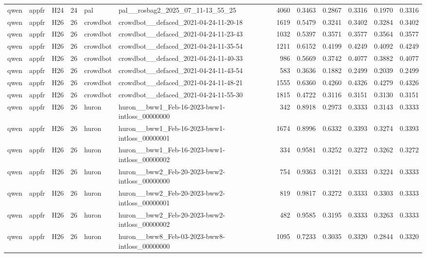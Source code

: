 \begin{table}[tbp]
\begin{tabular}{lllrllrrrrrr}
qwen & appfr & H24 & 24 & pal & pal\_\_rosbag2\_2025\_07\_11-13\_55\_25 & 4060 & 0.3463 & 0.2867 & 0.3316 & 0.1970 & 0.3316 \\
qwen & appfr & H26 & 26 & crowdbot & crowdbot\_\_defaced\_2021-04-24-11-20-18 & 1619 & 0.5479 & 0.3241 & 0.3402 & 0.3284 & 0.3402 \\
qwen & appfr & H26 & 26 & crowdbot & crowdbot\_\_defaced\_2021-04-24-11-23-43 & 1032 & 0.5397 & 0.3571 & 0.3577 & 0.3564 & 0.3577 \\
qwen & appfr & H26 & 26 & crowdbot & crowdbot\_\_defaced\_2021-04-24-11-35-54 & 1211 & 0.6152 & 0.4199 & 0.4249 & 0.4092 & 0.4249 \\
qwen & appfr & H26 & 26 & crowdbot & crowdbot\_\_defaced\_2021-04-24-11-40-33 & 986 & 0.5669 & 0.3742 & 0.4077 & 0.3882 & 0.4077 \\
qwen & appfr & H26 & 26 & crowdbot & crowdbot\_\_defaced\_2021-04-24-11-43-54 & 583 & 0.3636 & 0.1882 & 0.2499 & 0.2039 & 0.2499 \\
qwen & appfr & H26 & 26 & crowdbot & crowdbot\_\_defaced\_2021-04-24-11-48-21 & 1555 & 0.6360 & 0.4260 & 0.4326 & 0.4279 & 0.4326 \\
qwen & appfr & H26 & 26 & crowdbot & crowdbot\_\_defaced\_2021-04-24-11-55-30 & 1815 & 0.4722 & 0.3116 & 0.3151 & 0.3130 & 0.3151 \\
qwen & appfr & H26 & 26 & huron & huron\_\_bww1\_Feb-16-2023-bww1-intloss\_00000000 & 342 & 0.8918 & 0.2973 & 0.3333 & 0.3143 & 0.3333 \\
qwen & appfr & H26 & 26 & huron & huron\_\_bww1\_Feb-16-2023-bww1-intloss\_00000001 & 1674 & 0.8996 & 0.6332 & 0.3393 & 0.3274 & 0.3393 \\
qwen & appfr & H26 & 26 & huron & huron\_\_bww1\_Feb-16-2023-bww1-intloss\_00000002 & 334 & 0.9581 & 0.3252 & 0.3272 & 0.3262 & 0.3272 \\
qwen & appfr & H26 & 26 & huron & huron\_\_bww2\_Feb-20-2023-bww2-intloss\_00000000 & 754 & 0.9363 & 0.3121 & 0.3333 & 0.3224 & 0.3333 \\
qwen & appfr & H26 & 26 & huron & huron\_\_bww2\_Feb-20-2023-bww2-intloss\_00000001 & 819 & 0.9817 & 0.3272 & 0.3333 & 0.3303 & 0.3333 \\
qwen & appfr & H26 & 26 & huron & huron\_\_bww2\_Feb-20-2023-bww2-intloss\_00000002 & 482 & 0.9585 & 0.3195 & 0.3333 & 0.3263 & 0.3333 \\
qwen & appfr & H26 & 26 & huron & huron\_\_bww8\_Feb-03-2023-bww8-intloss\_00000000 & 1095 & 0.7233 & 0.3035 & 0.3320 & 0.2844 & 0.3320 \\

\end{tabular}
\end{table}
